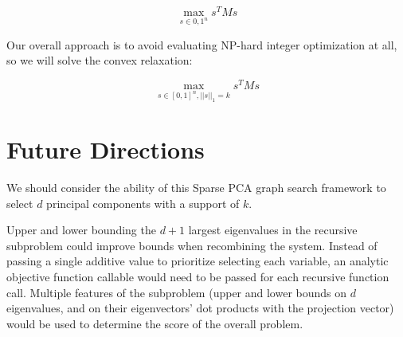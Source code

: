 \documentclass{article}
\begin{document}
$$
\max_{s \in {0,1}^n} s^T M s
$$

Our overall approach is to avoid evaluating NP-hard integer optimization at all, so we will solve the convex relaxation:

$$
\max_{s \in [0,1]^n, ||s||_1 = k} s^T M s
$$

\section{Future Directions}

We should consider the ability of this Sparse PCA graph search framework to select $d$ principal components with a support of $k$.


Upper and lower bounding the $d+1$ largest eigenvalues in the recursive subproblem could improve bounds when recombining the system. Instead of passing a single additive value to prioritize selecting each variable, an analytic objective function callable would need to be passed for each recursive function call. Multiple features of the subproblem (upper and lower bounds on $d$ eigenvalues, and on their eigenvectors' dot products with the projection vector) would be used to determine the score of the overall problem.
\end{document}
